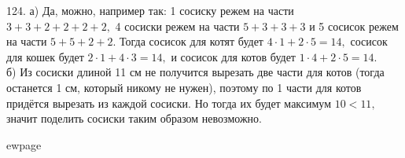 124. а) Да, можно, например так: 1 сосиску режем на части $3+3+2+2+2+2,$ 4 сосиски режем на части $5+3+3+3$ и 5 сосисок режем на части $5+5+2+2.$ Тогда сосисок для котят будет $4\cdot1+2\cdot5=14,$ сосисок для кошек будет $2\cdot1+4\cdot3=14,$ и сосисок для котов будет $1\cdot4+2\cdot5=14.$\\
б) Из сосиски длиной 11 см не получится вырезать две части для котов (тогда останется 1 см, который никому не нужен), поэтому по 1 части для котов придётся вырезать из каждой сосиски. Но тогда их будет максимум $10<11,$ значит поделить сосиски таким образом невозможно.

ewpage

